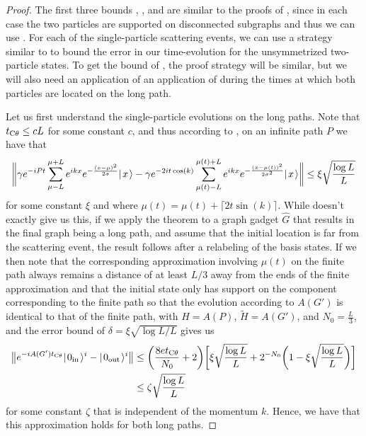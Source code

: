 \documentclass[../thesis-main/thesis-main]{subfiles}
\begin{document}
\begin{proof}
The first three bounds , , and  are similar to the proofs of , since in each case the two particles are supported on disconnected subgraphs and thus we can use .  For each of the single-particle scattering events, we can use a strategy similar to  to bound the error in our time-evolution for the unsymmetrized two-particle states.  To get the bound of , the proof strategy will be similar, but we will also need an application of an application of  during the times at which both particles are located on the long path.


Let us first understand the single-particle evolutions on the long paths. Note that $t_{\mathrm{C}\theta} \leq c L$ for some constant $c$, and thus according to , on an infinite path $P$ we have that
\begin{align}
  \bigg\Vert \gamma e^{- i P t } \sum_{\mu-L}^{\mu+L} e^{i k x} e^{-  \frac{(x-\mu)^2}{2\sigma} }|\mspace{2mu} x \mspace{2mu} \rangle - \gamma  e^{-2i t \cos(k)} \sum_{\mu(t) - L}^{\mu(t) + L} e^{ i k x} e^{- \frac{(x-\mu(t))^2}{2\sigma^2}} |\mspace{2mu} x \mspace{2mu} \rangle \bigg\Vert \leq \xi \sqrt{\frac{ \log L}{L}}
\end{align}
for some constant $\xi$ and where $\mu(t) = \mu(t) + \lceil 2 t \sin(k)\rceil$.  While  doesn't exactly give us this, if we apply the theorem to a graph gadget $\widehat{G}$ that results in the final graph being a long path, and assume that the initial location is far from the scattering event, the result follows after a relabeling of the basis states.  If we then note that the corresponding approximation involving $\mu(t)$ on the finite path always remains a distance of at least $L/3$ away from the ends of the finite approximation and that the initial state only has support on the component corresponding to the finite path so that the evolution according to $A(G')$ is identical to that of the finite path,  with $H = A(P)$, $\tilde{H} = A(G')$, and $N_0 = \frac{L}{3}$, and the error bound of $\delta =\xi \sqrt{\log L/L}$ gives us
\begin{align}
  \big\Vert e^{-i A(G') t_{\mathrm{C}\theta}} |\mspace{2mu} 0_{\text{in}} \mspace{2mu} \rangle^i - |\mspace{2mu} 0_\text{out} \mspace{2mu} \rangle^i\big\Vert &\leq \bigg( \frac{ 8 e t_{\mathrm{C}\theta}}{N_0} + 2 \bigg) \bigg[\xi \sqrt{\frac{\log L}{L}} + 2^{- N_0} \bigg( 1 - \xi \sqrt{\frac{\log L}{L}}\bigg)\bigg]\\
  & \leq \zeta \sqrt{ \frac{\log L}{L}}
\end{align}
for some constant $\zeta$ that is independent of the momentum $k$.  Hence, we have that this approximation holds for both long paths.



\end{proof}
\end{document}
